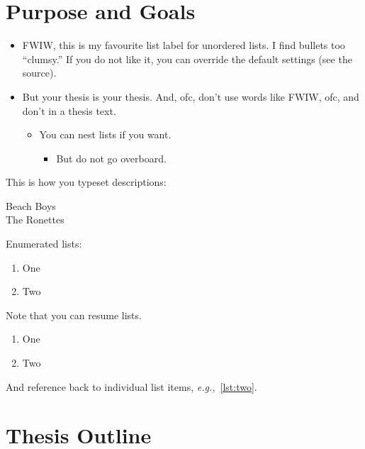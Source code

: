 \documentclass[11pt,titlepage,openright]{book}
\newcommand{\eg}{\emph{e.g.,}}
\begin{document}
\lipsum[3]

\section{Purpose and Goals}
\label{sec:purpose-goals}

\lipsum[4-6]

\begin{itemize}
\item FWIW, this is my favourite list label for unordered lists. I
  find bullets too ``clumsy.'' If you do not like it, you can
  override the default settings (see the source).
\item But your thesis is your thesis. And, ofc, don't use words
  like FWIW, ofc, and don't in a thesis text.

  \begin{itemize}
  \item You can nest lists if you want.

    \begin{itemize}
    \item But do not go overboard.
    \end{itemize}

  \end{itemize}
  
\end{itemize}

This is how you typeset descriptions:

\begin{description}
\item[Beach Boys] \lipsum[1]
\item[The Ronettes] \lipsum[2]
\end{description}

Enumerated lists:

\begin{enumerate}
\item One
\item Two
\end{enumerate}

Note that you can resume lists.

\begin{enumerate}[resume]
\item One
\item Two \label{lst:two}
\end{enumerate}

And reference back to individual list items, \eg{}~\cref{lst:two}.

\section{Thesis Outline}
\label{sec:thesis-outline}
\end{document}
